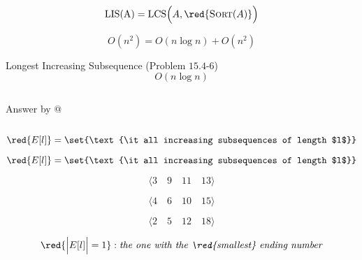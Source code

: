 \begin{frame}{}
  \[
    \text{LIS(A)} = \text{LCS} \Big(A, \red{\textsc{Sort}(A)} \Big)
  \]

  \pause
  \[
    O(n^2) = O(n \log n) + O(n^2)
  \]
\end{frame}

\begin{frame}{}
  \begin{exampleblock}{Longest Increasing Subsequence (Problem $15.4$-$6$)}
    \[
      O(n \log n)
    \]
  \end{exampleblock}

  \begin{columns}
    \pause
    \pause
      \centerline{Answer by  @ }
  \end{columns}
\end{frame}

\begin{frame}{}
  \[
    \red{E[l]} = \set{\text{\it all increasing subsequences of length $l$}}
  \]

  \pause

  
\end{frame}

\begin{frame}{}
  \[
    \red{E[l]} = \set{\text{\it all increasing subsequences of length $l$}}
  \]

  \pause
  \[
    \langle 3\quad 9\quad 11\quad 13 \rangle
  \]

  \[
    \langle 4\quad 6\quad 10\quad 15 \rangle
  \]

  \[
    \langle 2\quad 5\quad 12\quad 18 \rangle
  \]

  \pause
  \[
    \red{\Big|E[l]\Big| = 1}: \text{\it the one with the \red{\it smallest} ending number}
  \]
\end{frame}

\begin{frame}{}
  
\end{frame}

